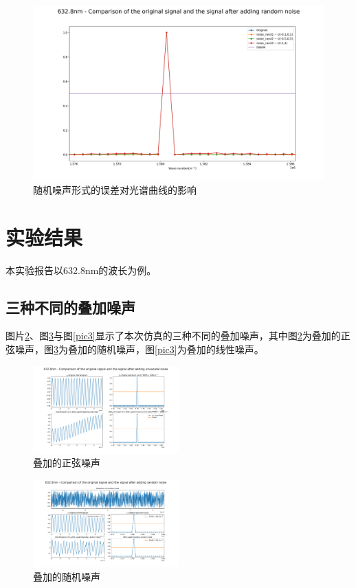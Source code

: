 \documentclass[conference]{IEEEtran}
\begin{document}
\begin{figure}[htbp]
	\centerline{
		\includegraphics[width=22cm]{all.png} 	
	}
	\caption{随机噪声形式的误差对光谱曲线的影响}
	\label{pic7}
\end{figure}

\section{实验结果}
本实验报告以632.8nm的波长为例。
\subsection{三种不同的叠加噪声}
图片\ref{pic1}、图\ref{pic2}与图\ref{pic3}显示了本次仿真的三种不同的叠加噪声，其中图\ref{pic1}为叠加的正弦噪声，图\ref{pic2}为叠加的随机噪声，图\ref{pic3}为叠加的线性噪声。

\begin{figure}[htbp]
    \centerline{\includegraphics[width=0.5\textwidth]{6.png}}
    \caption{叠加的正弦噪声}
    \label{pic1}
\end{figure}

\begin{figure}[htbp]
    \centerline{\includegraphics[width=0.5\textwidth]{2.png}}
    \caption{叠加的随机噪声}
    \label{pic2}
\end{figure}
\end{document}
